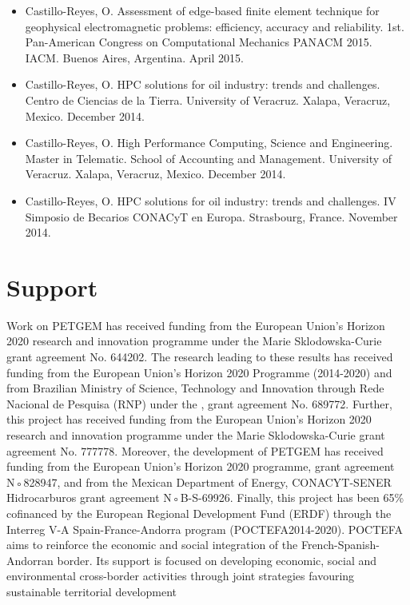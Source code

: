 \documentclass[letterpaper,10pt,english]{sphinxmanual}
\begin{document}
\begin{itemize}
\item {} 
Castillo-Reyes, O. Assessment of edge-based finite element technique for geophysical electromagnetic problems: efficiency, accuracy and reliability. 1st. Pan-American Congress on Computational Mechanics \textendash{} PANACM 2015. IACM. Buenos Aires, Argentina. April 2015.

\item {} 
Castillo-Reyes, O. HPC solutions for oil industry: trends and challenges. Centro de Ciencias de la Tierra. University of Veracruz. Xalapa, Veracruz, Mexico. December 2014.

\item {} 
Castillo-Reyes, O. High Performance Computing, Science and Engineering. Master in Telematic. School of Accounting and Management. University of Veracruz. Xalapa, Veracruz, Mexico. December 2014.

\item {} 
Castillo-Reyes, O. HPC solutions for oil industry: trends and challenges. IV Simposio de Becarios CONACyT en Europa. Strasbourg, France. November 2014.

\end{itemize}


\chapter{Support}
\label{\detokenize{Publications:support}}
Work on PETGEM has received funding from the European Union’s Horizon 2020 research and innovation programme under
the Marie Sklodowska-Curie grant agreement No. 644202. The research leading to these results has received funding
from the European Union’s Horizon 2020 Programme (2014-2020) and from Brazilian Ministry of Science, Technology and
Innovation through Rede Nacional de Pesquisa (RNP) under the  , grant agreement
No. 689772. Further, this project has received funding from the European Union’s Horizon 2020 research and innovation
programme under the Marie Sklodowska-Curie grant agreement No. 777778. Moreover, the development of PETGEM has received
funding from the European Union’s Horizon 2020 programme, grant agreement N◦828947, and from the Mexican Department of
Energy, CONACYT-SENER Hidrocarburos grant agreement N◦B-S-69926. Finally, this project has been 65\% cofinanced by the
European Regional Development Fund (ERDF) through the Interreg V-A Spain-France-Andorra program
(POCTEFA2014-2020). POCTEFA aims to reinforce the economic and social integration of the French-Spanish-Andorran
border. Its support is focused on developing economic, social and environmental cross-border activities through joint
strategies favouring sustainable territorial development
\end{document}

